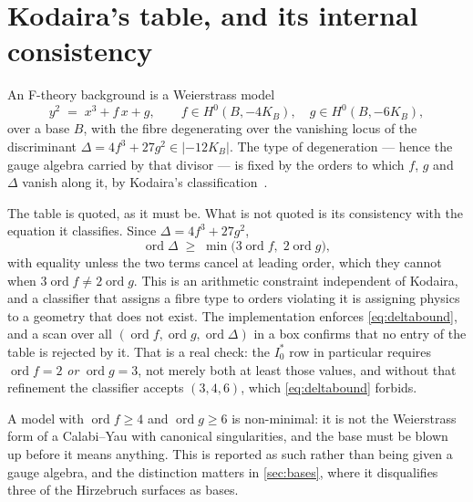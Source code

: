 \documentclass[11pt,a4paper]{article}
\theoremstyle{definition}
\begin{document}

\section{Kodaira's table, and its internal consistency}
\label{sec:kodaira}

An F-theory background is a Weierstrass model
%
\begin{equation}
y^2 \;=\; x^3 + f\,x + g ,
\qquad
f \in H^0(B, -4K_B),
\quad
g \in H^0(B, -6K_B),
\label{eq:weierstrass}
\end{equation}
%
over a base $B$, with the fibre degenerating over the vanishing locus of the
discriminant $\Delta = 4f^3 + 27g^2 \in |-12K_B|$. The type of degeneration
--- hence the gauge algebra carried by that divisor --- is fixed by the orders
to which $f$, $g$ and $\Delta$ vanish along it, by Kodaira's
classification~\cite{Kodaira1963,BIKMSV1996}.

The table is quoted, as it must be. What is not quoted is its consistency with
the equation it classifies. Since $\Delta = 4f^3 + 27g^2$,
%
\begin{equation}
\operatorname{ord}\Delta \;\geq\; \min\bigl(3\operatorname{ord}f,\;
2\operatorname{ord}g\bigr),
\label{eq:deltabound}
\end{equation}
%
with equality unless the two terms cancel at leading order, which they cannot
when $3\operatorname{ord}f \neq 2\operatorname{ord}g$. This is an arithmetic
constraint independent of Kodaira, and a classifier that assigns a fibre type
to orders violating it is assigning physics to a geometry that does not exist.
The implementation enforces \cref{eq:deltabound}, and a scan over all
$(\operatorname{ord}f, \operatorname{ord}g, \operatorname{ord}\Delta)$ in a
box confirms that no entry of the table is rejected by it. That is a real
check: the $I_0^*$ row in particular requires
$\operatorname{ord}f = 2$ \emph{or} $\operatorname{ord}g = 3$, not merely both
at least those values, and without that refinement the classifier accepts
$(3,4,6)$, which \cref{eq:deltabound} forbids.

A model with $\operatorname{ord}f \geq 4$ and $\operatorname{ord}g \geq 6$ is
non-minimal: it is not the Weierstrass form of a Calabi--Yau with canonical
singularities, and the base must be blown up before it means anything. This is
reported as such rather than being given a gauge algebra, and the distinction
matters in \cref{sec:bases}, where it disqualifies three of the Hirzebruch
surfaces as bases.
\end{document}
